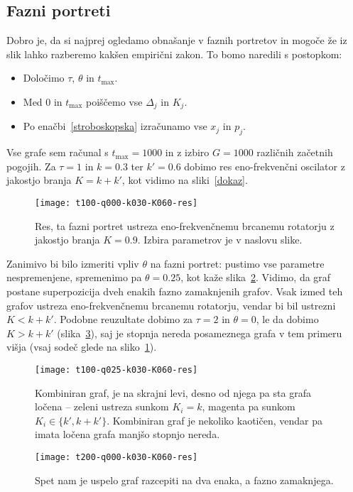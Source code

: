 \documentclass[a4paper, 12pt]{article}
\begin{document}
\subsection{Fazni portreti}

Dobro je, da si najprej ogledamo obna\v sanje v faznih portretov in mogo\v ce \v ze iz slik lahko razberemo kak\v sen
empiri\v cni zakon. To bomo naredili s postopkom:
\begin{itemize}
	\item{Dolo\v cimo $\tau$, $\theta$ in $t_\text{max}$.}
	\item{Med $0$ in $t_\text{max}$ poi\v s\v cemo vse $\Delta_j$ in $K_j$.}
	\item{Po ena\v cbi~\eqref{stroboskopska} izra\v cunamo vse $x_j$ in $p_j$.}
\end{itemize}
Vse grafe sem ra\v cunal s $t_\text{max} = 1000$ in z izbiro $G = 1000$ razli\v cnih za\v cetnih pogojih.
Za $\tau = 1$ in $k = 0.3$ ter $k' = 0.6$ dobimo res eno-frekven\v cni oscilator z jakostjo branja $K = k + k'$, kot vidimo
na sliki~\eqref{dokaz}.
\begin{figure}[H]\centering
	\texttt{[image: t100-q000-k030-K060-res]}
	\caption{Res, ta fazni portret ustreza eno-frekven\v cnemu brcanemu rotatorju z jakostjo branja $K = 0.9$. Izbira
		parametrov je v naslovu slike.}
	\label{dokaz}
\end{figure}
Zanimivo bi bilo izmeriti vpliv $\theta$ na fazni portret: pustimo vse parametre nespremenjene, spremenimo pa $\theta = 0.25$,
kot ka\v ze slika~\ref{theta025}. Vidimo, da graf postane superpozicija dveh enakih fazno zamaknjenih grafov. Vsak izmed
teh grafov ustreza eno-frekven\v cnemu brcanemu rotatorju, vendar bi bil ustrezni $K < k + k'$. Podobne reuzultate dobimo
za $\tau = 2$ in $\theta = 0$, le da dobimo $K > k + k'$ (slika~\ref{graf2}), saj je stopnja nereda posameznega grafa v tem
primeru vi\v sja (vsaj sode\v c glede na sliko~\ref{dokaz}).
\begin{landscape}
\begin{figure}[H]\centering
	\texttt{[image: t100-q025-k030-K060-res]}
	\caption{Kombiniran graf, je na skrajni levi, desno od njega pa sta grafa lo\v cena -- zeleni ustreza
		sunkom $K_i = k$, magenta pa sunkom $K_i \in \{k', k + k'\}$. Kombiniran graf je
		nekoliko kaoti\v cen, vendar pa imata lo\v cena grafa manj\v so stopnjo nereda.}
	\label{theta025}
\end{figure}
\begin{figure}[H]\centering
	\texttt{[image: t200-q000-k030-K060-res]}
	\caption{Spet nam je uspelo graf razcepiti na dva enaka, a fazno zamaknjega.}
	\label{graf2}
\end{figure}
\end{landscape}
\end{document}
